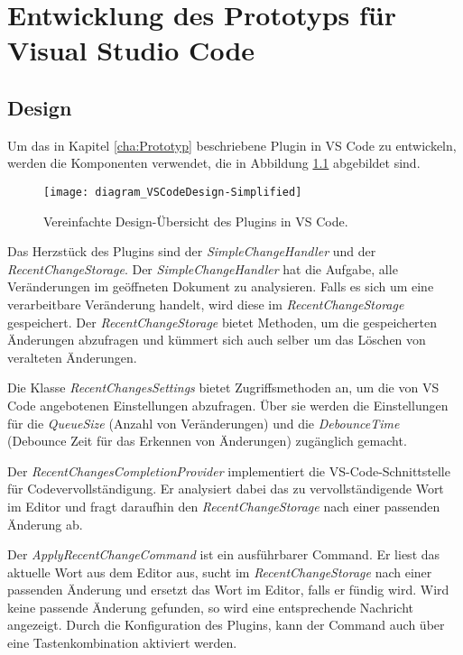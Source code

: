 \chapter{Entwicklung des Prototyps für Visual Studio Code}
\label{cha:EntwicklungVsCode}

\section{Design}
\label{sec:EntwicklungVsCode_Design}

Um das in Kapitel \ref{cha:Prototyp} beschriebene Plugin in VS Code
zu entwickeln, werden die Komponenten verwendet, die in 
Abbildung \ref{fig:diagram_VSCodeDesign-Simplified} abgebildet sind.
\begin{figure}
    \centering
    \texttt{[image: diagram\_VSCodeDesign-Simplified]}
    \caption{Vereinfachte Design-Übersicht des Plugins in  VS Code.}
    \label{fig:diagram_VSCodeDesign-Simplified}
\end{figure}  

Das Herzstück des Plugins sind der \emph{SimpleChangeHandler} und
der \emph{RecentChangeStorage}. Der \emph{SimpleChangeHandler} hat die Aufgabe,
alle Veränderungen im geöffneten Dokument zu analysieren. Falls es sich um
eine verarbeitbare Veränderung handelt, wird diese im \emph{RecentChangeStorage}
gespeichert. Der \emph{RecentChangeStorage} bietet Methoden, um die
gespeicherten Änderungen abzufragen und kümmert sich auch selber um das
Löschen von veralteten Änderungen.

Die Klasse \emph{RecentChangesSettings} bietet Zugriffsmethoden an,
um die von VS Code angebotenen Einstellungen abzufragen. Über sie
werden die Einstellungen für die \emph{QueueSize} (Anzahl von Veränderungen)
und die \emph{DebounceTime} (Debounce Zeit für das Erkennen von Änderungen)
zugänglich gemacht.

Der \emph{RecentChangesCompletionProvider} implementiert die VS-Code-Schnittstelle
für Codevervollständigung. Er analysiert dabei das zu vervollständigende Wort
im Editor und fragt daraufhin den \emph{RecentChangeStorage} nach einer passenden
Änderung ab.

Der \emph{ApplyRecentChangeCommand} ist ein ausführbarer Command. Er liest
das aktuelle Wort aus dem Editor aus, sucht im \emph{RecentChangeStorage}
nach einer passenden Änderung und ersetzt das Wort im Editor, falls
er fündig wird. Wird keine passende Änderung gefunden, so wird eine entsprechende
Nachricht angezeigt. Durch die Konfiguration des Plugins, kann der
Command auch über eine Tastenkombination aktiviert werden.

